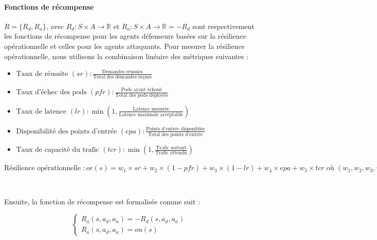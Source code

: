 \noindent \paragraph{\textbf{Fonctions de récompense}} $R = \{R_d, R_a\}$, avec $R_d: S \times A \to \mathbb{R}$ et $R_a: S \times A \to \mathbb{R} = - R_d$ sont respectivement les fonctions de récompense pour les agents défenseurs basées sur la résilience opérationnelle et celles pour les agents attaquants.
Pour mesurer la résilience opérationnelle, nous utilisons la combinaison linéaire des métriques suivantes :
%
\begin{itemize}
    \vspace{0,15cm}
    \item $\text{Taux de réussite } (sr) : \frac{\text{Demandes réussies}}{\text{Total des demandes reçues}}$
    \vspace{0,15 cm}
    \item $\text{Taux d'échec des pods } (pfr) : \frac{\text{Pods ayant échoué}}{\text{Total des pods déployés}}$
    \vspace{0,15 cm}
    \item $\text{Taux de latence } (lr) : \min\left(1,\frac{\text{Latence mesurée}}{\text{Latence maximale acceptable}}\right)$
    \vspace{0,15 cm}   
    \item $\text{Disponibilité des points d'entrée } (epa) : \frac{\text{Points d'entrée disponibles}}{\text{Total des points d'entrée}}$
    \vspace{0,15 cm}
    \item $\text{Taux de capacité du trafic } (tcr) : \min\left(1, \frac{\text{Trafic sortant}}{\text{Trafic attendu}}\right)$
\end{itemize}

\vspace{0,3cm}

$\text{Résilience opérationnelle }: or(s) = w_1 \times sr
\allowbreak + w_2 \times (1 - pfr)
\allowbreak + w_3 \times (1 - lr)
\allowbreak + w_4 \times epa
\allowbreak + w_5 \times tcr
\text{ où } (w_1, w_2, w_3, w_4, w_5) \text{ sont des pondérations relatives.}$

\

Ensuite, la fonction de récompense est formalisée comme suit :

$$
\begin{cases} 
    R_a(s, a_d, a_a) = -R_d(s, a_d, a_a) & \\
    R_a(s, a_d, a_a) = ou(s)
\end{cases}
$$

